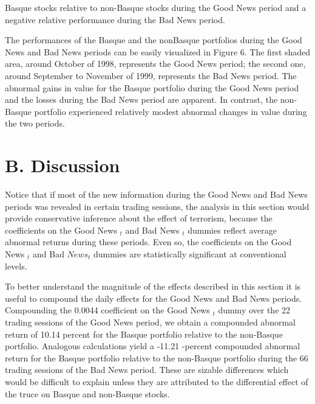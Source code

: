 \documentclass[10pt]{article}
\begin{document}
Basque stocks relative to non-Basque stocks during the Good News period and a negative relative performance during the Bad News period.

The performances of the Basque and the nonBasque portfolios during the Good News and Bad News periods can be easily visualized in Figure 6. The first shaded area, around October of 1998, represents the Good News period; the second one, around September to November of 1999, represents the Bad News period. The abnormal gains in value for the Basque portfolio during the Good News period and the losses during the Bad News period are apparent. In contrast, the non-Basque portfolio experienced relatively modest abnormal changes in value during the two periods.

\section*{B. Discussion}
Notice that if most of the new information during the Good News and Bad News periods was revealed in certain trading sessions, the analysis in this section would provide conservative inference about the effect of terrorism, because the coefficients on the Good News ${ }_{t}$ and Bad News ${ }_{t}$ dummies reflect average abnormal returns during these periods. Even so, the coefficients on the Good News ${ }_{t}$ and Bad $N e w s_{t}$ dummies are statistically significant at conventional levels.

To better understand the magnitude of the effects described in this section it is useful to compound the daily effects for the Good News and Bad News periods. Compounding the 0.0044 coefficient on the Good News ${ }_{t}$ dummy over the 22 trading sessions of the Good News period, we obtain a compounded abnormal return of 10.14 percent for the Basque portfolio relative to the non-Basque portfolio. Analogous calculations yield a -11.21 -percent compounded abnormal return for the Basque portfolio relative to the non-Basque portfolio during the 66 trading sessions of the Bad News period. These are sizable differences which would be difficult to explain unless they are attributed to the differential effect of the truce on Basque and non-Basque stocks.
\end{document}
